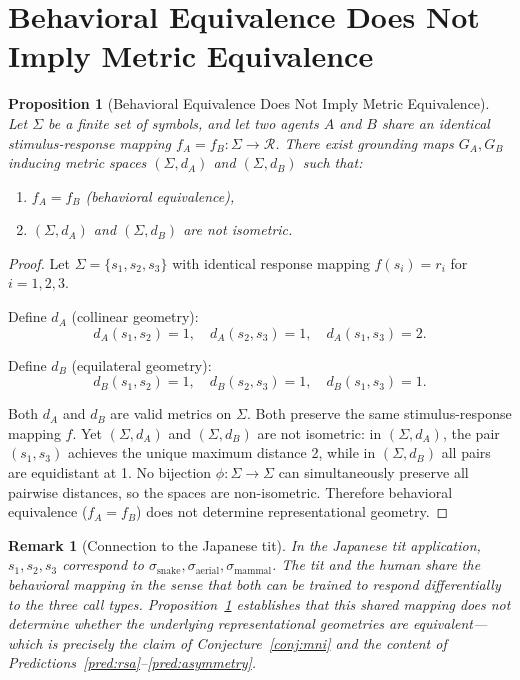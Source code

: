 \documentclass[12pt]{article}
\newtheorem{proposition}{Proposition}
\newtheorem{remark}{Remark}
\begin{document}
\appendix
\section{Behavioral Equivalence Does Not Imply Metric Equivalence}
\label{app:proposition}

\begin{proposition}[Behavioral Equivalence Does Not Imply Metric Equivalence]
\label{prop:main}
Let $\Sigma$ be a finite set of symbols,
and let two agents $A$ and $B$ share an identical
stimulus-response mapping $f_A = f_B : \Sigma \to \mathcal{R}$.
There exist grounding maps $G_A, G_B$ inducing metric spaces
$(\Sigma, d_A)$ and $(\Sigma, d_B)$ such that:
\begin{enumerate}
  \item $f_A = f_B$ \emph{(behavioral equivalence)},
  \item $(\Sigma, d_A)$ and $(\Sigma, d_B)$ are \emph{not isometric}.
\end{enumerate}
\end{proposition}

\begin{proof}
Let $\Sigma = \{s_1, s_2, s_3\}$ with identical response mapping
$f(s_i) = r_i$ for $i = 1, 2, 3$.

Define $d_A$ (collinear geometry):
\[
d_A(s_1, s_2) = 1,\quad
d_A(s_2, s_3) = 1,\quad
d_A(s_1, s_3) = 2.
\]

Define $d_B$ (equilateral geometry):
\[
d_B(s_1, s_2) = 1,\quad
d_B(s_2, s_3) = 1,\quad
d_B(s_1, s_3) = 1.
\]

Both $d_A$ and $d_B$ are valid metrics on $\Sigma$.
Both preserve the same stimulus-response mapping $f$.
Yet $(\Sigma, d_A)$ and $(\Sigma, d_B)$ are not isometric:
in $(\Sigma, d_A)$, the pair $(s_1, s_3)$ achieves the unique
maximum distance 2, while in $(\Sigma, d_B)$ all pairs are
equidistant at 1.
No bijection $\phi: \Sigma \to \Sigma$ can simultaneously preserve
all pairwise distances, so the spaces are non-isometric.
Therefore behavioral equivalence ($f_A = f_B$) does not determine
representational geometry.
\end{proof}

\begin{remark}[Connection to the Japanese tit]
In the Japanese tit application, $s_1, s_2, s_3$ correspond to
$\sigma_\mathrm{snake}, \sigma_\mathrm{aerial}, \sigma_\mathrm{mammal}$.
The tit and the human share the behavioral mapping in the sense that
both can be trained to respond differentially to the three call types.
Proposition~\ref{prop:main} establishes that this shared mapping
does not determine whether the underlying representational geometries
are equivalent---which is precisely the claim of
Conjecture~\ref{conj:mni} and the content of
Predictions~\ref{pred:rsa}--\ref{pred:asymmetry}.
\end{remark}
\end{document}
